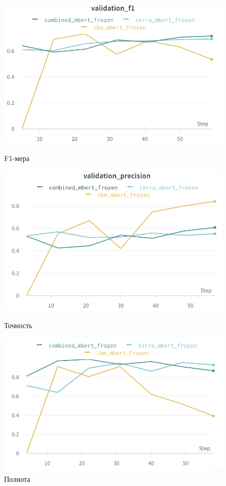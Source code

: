 \begin{figure}[h!]
  \centering
  \begin{minipage}[b]{0.45\textwidth}
    \includegraphics[width=\textwidth]{f1.png}
    \caption{F1-мера}
  \end{minipage}
  \hfill
  \begin{minipage}[b]{0.45\textwidth}
    \includegraphics[width=\textwidth]{precision.png}
    \caption{Точность}
  \end{minipage}
  \begin{minipage}[b]{0.45\textwidth}
    \includegraphics[width=\textwidth]{recall.png}
    \caption{Полнота}
    \label{pd_3}
  \end{minipage}
\end{figure}

